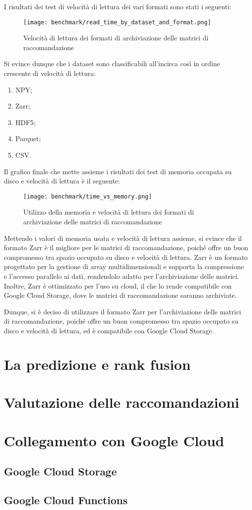 I risultati dei test di velocità di lettura dei vari formati sono stati i seguenti:
\begin{figure}[!h]
    \centering
    \texttt{[image: benchmark/read\_time\_by\_dataset\_and\_format.png]}
    \caption{Velocità di lettura dei formati di archiviazione delle matrici di raccomandazione}
    \label{fig:read-speed-recommendation-matrices}
\end{figure}

Si evince dunque che i dataset sono classificabili all'incirca così in ordine crescente di velocità di lettura:
\begin{enumerate}
    \item NPY;
    \item Zarr;
    \item HDF5;
    \item Parquet;
    \item CSV.
\end{enumerate}

Il grafico finale che mette assieme i risultati dei test di memoria occupata su disco e velocità di lettura è il seguente:

\begin{figure}[!h]
    \centering
    \texttt{[image: benchmark/time\_vs\_memory.png]}
    \caption{Utilizzo della memoria e velocità di lettura dei formati di archiviazione delle matrici di raccomandazione}
    \label{fig:memory-usage-and-read-speed-recommendation-matrices}
\end{figure}

Mettendo i valori di memoria usata e velocità di lettura assieme, si evince che il formato Zarr è il migliore per le matrici di raccomandazione, poiché offre un buon compromesso tra spazio occupato su disco e velocità di lettura. Zarr è un formato progettato per la gestione di array multidimensionali e supporta la compressione e l'accesso parallelo ai dati, rendendolo adatto per l'archiviazione delle matrici. Inoltre, Zarr è ottimizzato per l'uso su cloud, il che lo rende compatibile con Google Cloud Storage, dove le matrici di raccomandazione saranno archiviate.

Dunque, si è deciso di utilizzare il formato Zarr per l'archiviazione delle matrici di raccomandazione, poiché offre un buon compromesso tra spazio occupato su disco e velocità di lettura, ed è compatibile con Google Cloud Storage.


\section{La predizione e rank fusion}

\section{Valutazione delle raccomandazioni}

\section{Collegamento con Google Cloud}
\subsection{Google Cloud Storage}
\subsection{Google Cloud Functions}

